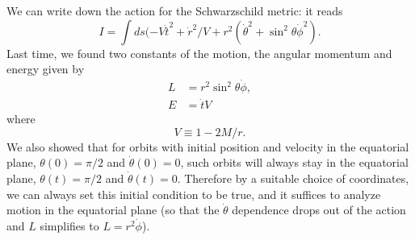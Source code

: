 We can write down the action for the Schwarzschild metric: it reads
$$I=\int ds (-V\dot t^2 +\dot r^2/V + r^2(\dot\theta^2 +\sin^2\theta \dot\phi^2).$$ 
Last time, we found two constants of the motion, the angular momentum and energy given by
\begin{align*}
    L&= r^2\sin^2\theta \dot \phi,\\
    E&= \dot t V
\end{align*}
where $$V\equiv 1-2M/r.$$
We also showed that for orbits with initial position and velocity in the equatorial plane, $\theta(0)=\pi/2$ and $\dot \theta(0)=0$, such orbits will always stay in the equatorial plane, $\theta(t)=\pi/2$ and $\dot \theta(t)=0$. Therefore by a suitable choice of coordinates, we can always set this initial condition to be true, and it suffices to analyze motion in the equatorial plane (so that the $\dot \theta$ dependence drops out of the action and $L$ simplifies to $L=r^2 \dot \phi$). 

